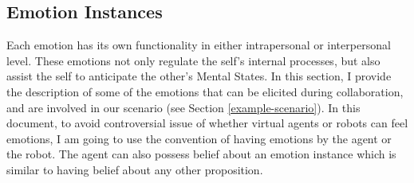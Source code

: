 \documentclass[12pt]{report}
\begin{document}
\subsection{Emotion Instances}
\label{section-emotion-instances}

Each emotion has its own functionality in either intrapersonal or interpersonal
level. These emotions not only regulate the self's internal processes, but also
assist the self to anticipate the other's Mental States. In this section, I
provide the description of some of the emotions that can be elicited during
collaboration, and are involved in our scenario (see Section
\ref{example-scenario}). In this document, to avoid controversial issue of
whether virtual agents or robots can feel emotions, I am going to use the
convention of having emotions by the agent or the robot. The agent can also
possess belief about an emotion instance which is similar to having belief about
any other proposition.
\end{document}
